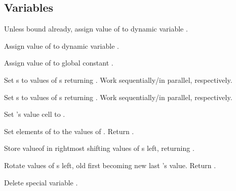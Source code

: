 \subsection{Variables}

\begin{LIST}{1cm}

  {
  Unless bound already, assign value of  to dynamic variable
  . 
  }

  {
  Assign value of  to dynamic variable .
  }

  {
  Assign value of  to global constant .
  }

  {
  Set s to values of s returning . Work sequentially/in parallel, respectively. 
  }

  {
  Set s to values of s returning . Work sequentially/in parallel, respectively. 
  }

  {
  Set 's value cell to .
  }

  {
  Set elements of  to the values of
  . Return .
  }

  {
  Store valueof  in rightmost  shifting values of
  s left, returning . 
  }

  {
  Rotate values of s left, old first becoming new last
  's value. Return \retval{\NIL}.
  }

  {
  Delete special variable .
  }


\end{LIST}
